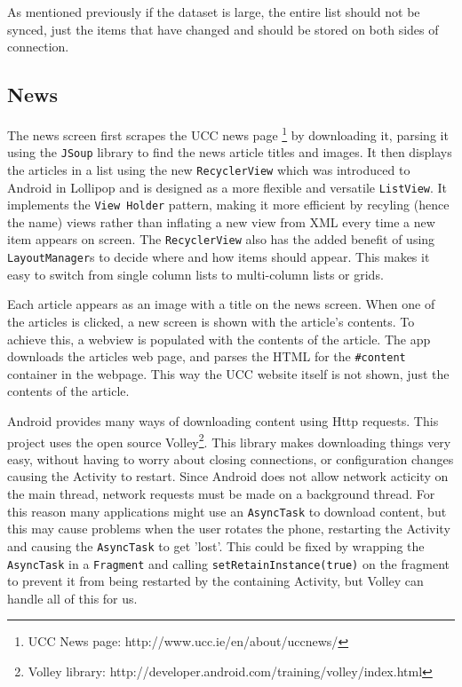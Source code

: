As mentioned previously if the dataset is large, the entire list should not be
synced, just the items that have changed and should be stored on both sides of
connection.


\subsection{News}

The news screen first scrapes the UCC news page
\footnote{UCC News page: http://www.ucc.ie/en/about/uccnews/} by downloading it,
parsing it using the \texttt{JSoup} library to find the news article titles and
images. It then displays the articles in a list using the new
\texttt{RecyclerView} which was introduced to Android in Lollipop and is
designed as a more flexible and versatile \texttt{ListView}. It implements the
\texttt{View Holder} pattern, making it more efficient by recyling (hence the
name) views rather than inflating a new view from XML every time a new item
appears on screen. The \texttt{RecyclerView} also has the added benefit of using
\texttt{LayoutManager}s to decide where and how items should appear. This makes
it easy to switch from single column lists to multi-column lists or grids.

Each article appears as an image with a title on the news screen. When one of
the articles is clicked, a new screen is shown with the article's contents. To
achieve this, a webview is populated with the contents of the article. The app
downloads the articles web page, and parses the HTML for the \texttt{\#content}
container in the webpage. This way the UCC website itself is not shown, just
the contents of the article.

Android provides many ways of downloading content using Http requests. This
project uses the open source
Volley\footnote{Volley library: http://developer.android.com/training/volley/index.html}.
This library makes downloading things very easy, without having to worry about
closing connections, or configuration changes causing the Activity to restart.
Since Android does not allow network acticity on the main thread, network
requests must be made on a background thread. For this reason many applications
might use an \texttt{AsyncTask} to download content, but this may cause problems
when the user rotates the phone, restarting the Activity and causing the 
\texttt{AsyncTask} to get 'lost'. This could be fixed by wrapping the
\texttt{AsyncTask} in a \texttt{Fragment} and calling
\texttt{setRetainInstance(true)} on the fragment to prevent it from being
restarted by the containing Activity, but Volley can handle all of this for us.

